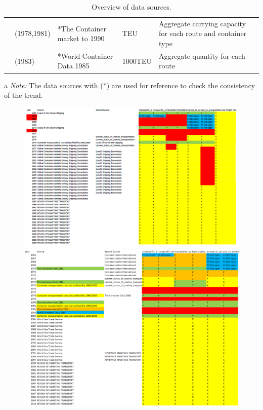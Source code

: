 \begin{landscape}
{\begin{table}[htb]
{\begin{tabular}{lllll}
                    &(1978,1981)&*The Container market to 1990 &TEU&Aggregate carrying capacity for each route and container type\\
                    &(1983)&*World Container Data 1985 &1000TEU&Aggregate quantity for each route
  \end{tabular}
  \begin{tablenotes}
\item[a]\textit{Note:} The data sources with ($*$) are used for reference to check the consistency of the trend.
\end{tablenotes}
  }
  \caption{Overview of data sources.}
  \label{tb:overview_of_datasources}
\end{table}
\begin{figure}[!ht]
\begin{minipage}[b]{0.45\linewidth}
  \centering
  \includegraphics[height = 0.4\textheight]{freight_rate_filled_and_imputed_summary.png}
  \end{minipage}
  \begin{minipage}[b]{0.45\linewidth}
  \centering
  \includegraphics[height = 0.4\textheight]{traffic_amount_filled_and_imputed_summary.png}

\end{minipage}
\end{figure}}
\end{landscape}
